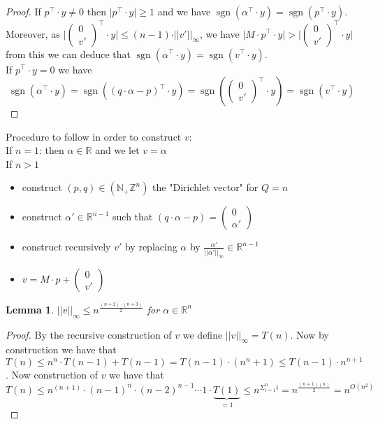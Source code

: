 \documentclass[a4paper,11pt,american]{article}
\newcommand{\N}{\mathbb{N}}
\newcommand{\R}{\mathbb{R}}
\newcommand{\Z}{\mathbb{Z}}
\newcommand{\norm}[1]{\vert\vert#1\vert\vert}
\DeclareMathOperator{\sign}{sgn}
\theoremstyle{plain}
\newtheorem{lemma}[theorem]{Lemma}
\theoremstyle{definition}
\begin{document}
    \begin{proof}
        If $p^\top\cdot y\neq 0$ then $\vert p^\top\cdot y\vert\geq 1$ and we have $\sign(\alpha^\top\cdot y)=\sign(p^\top\cdot y)$. Moreover, as $\vert \begin{pmatrix}
            0\\
            v'
        \end{pmatrix}^\top\cdot y\vert\leq (n-1)\cdot \norm{v'}_\infty$, we have $\vert M\cdot p^\top\cdot y\vert>\vert \begin{pmatrix}
            0\\
            v'
        \end{pmatrix}^\top\cdot y\vert$ from this we can deduce that $\sign(\alpha^\top\cdot y)=\sign(v^\top\cdot y)$.\\
        If $p^\top\cdot y=0$ we have $$\sign(\alpha^\top \cdot y)=\sign((q\cdot\alpha-p)^\top\cdot y)=\sign(\begin{pmatrix}
        0\\
        v'
    \end{pmatrix}^\top\cdot y)=\sign(v^\top\cdot y)$$
    \end{proof}
Procedure to follow in order to construct $v$:\\
If $n=1$: then $\alpha\in\R$ and we let $v=\alpha$\\
If $n>1$\begin{itemize}
    \item construct $(p,q)\in(\N_+\Z^n)$ the "Dirichlet vector" for $Q=n$
    \item construct $\alpha'\in\R^{n-1}$ such that $(q\cdot \alpha-p)=\begin{pmatrix}
        0\\
        \alpha'
    \end{pmatrix}$
    \item construct recursively $v'$ by replacing $\alpha$ by $\frac{\alpha'}{\norm{\alpha'}_{\infty}}\in\R^{n-1}$
    \item $v=M\cdot p +\begin{pmatrix}
        0\\
        v'
    \end{pmatrix}$
\end{itemize} 
\begin{lemma}
    $\norm{v}_\infty\leq n^{\frac{(n+2)\cdot(n+3)}{2}}$ for $\alpha\in\R^n$
\end{lemma}
\begin{proof}
    By the recursive construction of $v$ we define $\norm{v}_\infty=T(n)$. Now by construction we have that $T(n)\leq n^n\cdot T(n-1)+ T(n-1)= T(n-1)\cdot(n^n+1)\leq T(n-1)\cdot n^{n+1}$. Now construction of $v$ we have that $$T(n)\leq n^{(n+1)}\cdot (n-1)^n\cdot (n-2)^{n-1}\cdots1\cdot \underbrace{T(1)}_{=1 }\leq n^{\Sigma_{i=1}^n i}=n^{\frac{(n+1)(n)}{2}}=n^{O(n^2)}$$
\end{proof}
\end{document}
